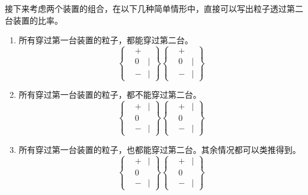 \documentclass[12pt,a4paper,oneside]{book}
\begin{document}
接下来考虑两个装置的组合，在以下几种简单情形中，直接可以写出粒子透过第二台装置的比率。

\begin{enumerate}
    \item 所有穿过第一台装置的粒子，都能穿过第二台。
    \begin{equation*}
        \left\{\begin{aligned}
            &+ \\
            &0&\boldsymbol{|}\\
            &-&\boldsymbol{|}
            \end{aligned}\right\}
        \left\{\begin{aligned}
            &+ \\
            &0&\boldsymbol{|}\\
            &-&\boldsymbol{|}
            \end{aligned}\right\}
    \end{equation*}
    \item 所有穿过第一台装置的粒子，都不能穿过第二台。
    \begin{equation*}
        \left\{\begin{aligned}
            &+&\boldsymbol{|} \\
            &0\\
            &-&\boldsymbol{|}
            \end{aligned}\right\}
        \left\{\begin{aligned}
            &+&\boldsymbol{|} \\
            &0\\
            &-&\boldsymbol{|}
            \end{aligned}\right\}
    \end{equation*}
    \item 所有穿过第一台装置的粒子，也都能穿过第二台。其余情况都可以类推得到。
    \begin{equation*}
        \left\{\begin{aligned}
            &+&\boldsymbol{|} \\
            &0\\
            &-&\boldsymbol{|}
            \end{aligned}\right\}
        \left\{\begin{aligned}
            &+&\boldsymbol{|} \\
            &0\\
            &-&\boldsymbol{|}
            \end{aligned}\right\}
    \end{equation*}    
\end{enumerate}
\end{document}
